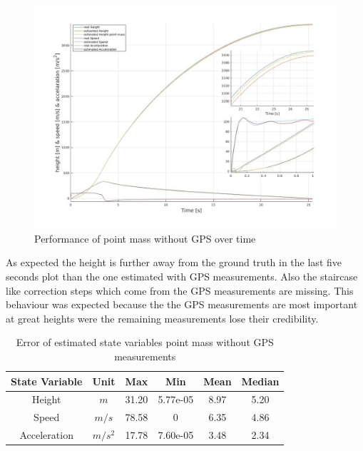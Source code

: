 \begin{figure}[h!]
 \centering
 \includegraphics[width=.8 \textwidth]{./Pictures/PointMassWihtoutGPSPerformance.jpg}
 \caption{Performance of point mass without GPS over time}
 \label{fig:PointMassWithoutGPSPerformance}
\end{figure}

As expected the height is further away from the ground truth in the last five seconds plot than the one estimated with GPS measurements.
Also the staircase like correction steps which come from the GPS measurements are missing.
This behaviour was expected because the the GPS measurements are most important at great heights were the remaining measurements lose their credibility.


\begin{table}[h!]
\centering
\begin{tabular}{cccccc}
\hline
\multicolumn{1}{|c|}{State Variable} & \multicolumn{1}{c|}{Unit} & \multicolumn{1}{c|}{Max} & \multicolumn{1}{c|}{Min} & \multicolumn{1}{c|}{Mean} & \multicolumn{1}{c|}{Median} \\ \hline
Height                            & $m$                         & 31.20                  & 5.77e-05                 & 8.97                    & 5.20                      \\
Speed                             & $m/s$                       & 78.58                  & 0                        & 6.35                    & 4.86                      \\
Acceleration                       & $m/s^2$   			& 17.78                  & 7.60e-05                 & 3.48                    & 2.34
\end{tabular}
\caption{Error of estimated state variables point mass without GPS measurements}
\label{tab:ErrorPointMassWithoutGPS}
\end{table}

